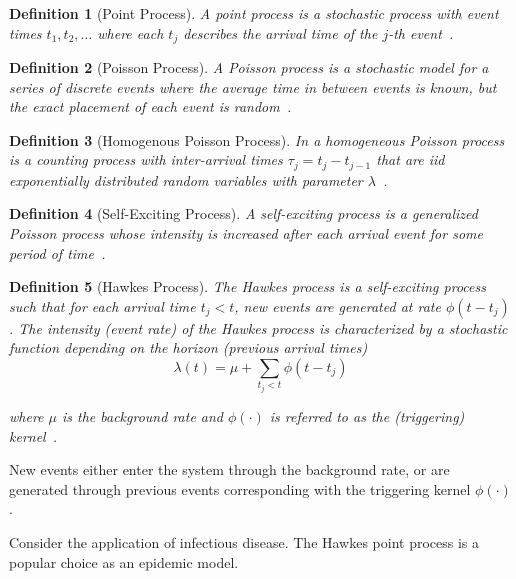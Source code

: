 \documentclass[12pt]{article}
\newtheorem{definition}{Definition}
\begin{document}
\begin{definition}[Point Process]
A point process is a stochastic process with event times $t_1, t_2, \ldots$ where each $t_j$ describes the arrival time of the $j$-th event~\cite{Rizoiu2018}.
\end{definition}
\vspace{3mm}

\begin{definition}[Poisson Process]
A Poisson process is a stochastic model for a series of discrete events where the average time in between events is known, but the exact placement of each event is random~\cite{Rizoiu2018}. 
\end{definition}
\vspace{3mm}

\begin{definition}[Homogenous Poisson Process]
In a homogeneous Poisson process is a counting process with inter-arrival times $\tau_j = t_j - t_{j-1}$ that are iid exponentially distributed random variables with parameter $\lambda$~\cite{Rizoiu2018}. 
\end{definition}
\vspace{3mm}

\begin{definition}[Self-Exciting Process] 
A self-exciting process is a generalized Poisson process whose intensity is increased after each arrival event for some period of time~\cite{Dahlqvist2022}.
\end{definition}
\vspace{3mm}

\begin{definition}[Hawkes Process]
The Hawkes process is a self-exciting process such that for each arrival time $t_j < t$, new events are generated at rate $\phi(t - t_j)$. The intensity (event rate) of the Hawkes process is characterized by a stochastic function depending on the horizon (previous arrival times)
\[
\lambda(t) = \mu + \sum_{t_j < t} \phi(t - t_j)
\]

where $\mu$ is the background rate and $\phi(\cdot)$ is referred to as the (triggering) kernel~\cite{Rizoiu2018, Reinhart2018}.
\end{definition}
\vspace{3mm}
New events either enter the system through the background rate, or are generated through previous events corresponding with the triggering kernel $\phi(\cdot)$. 


Consider the application of infectious disease. The Hawkes point process is a popular choice as an epidemic model. 
\vspace{3mm}
\end{document}
